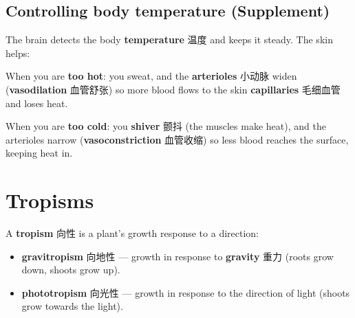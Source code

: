 \documentclass[11pt]{article}
\begin{document}
\subsection*{Controlling body temperature (Supplement)}

The brain detects the body \textbf{temperature} 温度 and keeps it steady. The skin helps:

\begin{center}
\end{center}

When you are \textbf{too hot}: you sweat, and the \textbf{arterioles} 小动脉 widen (\textbf{vasodilation} 血管舒张) so more blood flows to the skin \textbf{capillaries} 毛细血管 and loses heat.

When you are \textbf{too cold}: you \textbf{shiver} 颤抖 (the muscles make heat), and the arterioles narrow (\textbf{vasoconstriction} 血管收缩) so less blood reaches the surface, keeping heat in.

\section*{Tropisms}

A \textbf{tropism} 向性 is a plant's growth response to a direction:

\begin{itemize}
\item \textbf{gravitropism} 向地性 — growth in response to \textbf{gravity} 重力 (roots grow down, shoots grow up).

\item \textbf{phototropism} 向光性 — growth in response to the direction of light (shoots grow towards the light).

\end{itemize}
\end{document}
